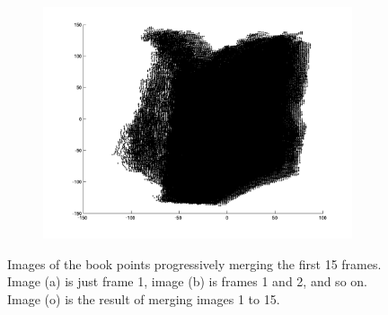 \begin{figure}[H]
\begin{subfigure}[b]{0.3\textwidth}
		\includegraphics[width=\textwidth]{Images/Book15.png}
		\caption{}
	\end{subfigure}	
	
	\caption{Images of the book points progressively merging the first 15 frames. Image (a) is just frame 1, image (b) is frames 1 and 2, and so on. Image (o) is the result of merging images 1 to 15.}
	\label{fig:mergedBooks1}
\end{figure}

